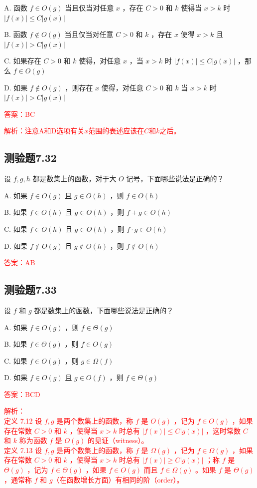 \documentclass[UTF8, heading=true]{ctexart}
\begin{document}
A. 
函数 $f \in O(g)$ 当且仅当对任意 $x$ ，存在 $C>0$ 和 $k$ 使得当 $x>k$ 时 $|f(x)| \leq C|g(x)|$

B. 
函数 $f \notin O(g)$ 当且仅当对任意 $C>0$ 和 $k$ ，存在 $x$ 使得 $x>k$ 且 $|f(x)|>C|g(x)|$

C. 
如果存在 $C>0$ 和 $k$ 使得，对任意 $x$ ，当 $x>k$ 时 $|f(x)| \leq C|g(x)|$ ，那么 $f \in O(g)$

D. 
如果 $f \notin O(g)$ ，则存在 $x$ 使得，对任意 $C>0$ 和 $k$ 当 $x>k$ 时 $|f(x)|>C|g(x)|$

\textcolor{red}{答案：BC}

\textcolor{red}{解析：注意A和D选项有关$x$范围的表述应该在$C$和$k$之后。}

\subsection{测验题7.32}

设 $f, g, h$ 都是数集上的函数，对于大 $O$ 记号，下面哪些说法是正确的？

A. 如果 $f \in O(g)$ 且 $g \in O(h)$ ，则 $f \in O(h)$

B. 如果 $f \in O(h)$ 且 $g \in O(h)$ ，则 $f+g \in O(h)$

C. 如果 $f \in O(h)$ 且 $g \in O(h)$ ，则 $f \cdot g \in O(h)$

D. 如果 $f \notin O(g)$ 且 $g \notin O(h)$ ，则 $f \notin O(h)$

\textcolor{red}{答案：AB}

\subsection{测验题7.33}

设 $f$ 和 $g$ 都是数集上的函数，下面哪些说法是正确的？

A. 如果 $f \in O(g)$ ，则 $f \in \Theta(g)$

B. 如果 $f \in \Theta(g)$ ，则 $f \in O(g)$

C. 如果 $f \in O(g)$ ，则 $g \in \Omega(f)$

D. 如果 $f \in O(g)$ 且 $g \in O(f)$ ，则 $f \in \Theta(g)$

\textcolor{red}{答案：BCD}

\textcolor{red}{解析：\\ \indent 定义 7.12 设 $f, g$ 是两个数集上的函数，称 $f$ 是 $O(g)$ ，记为 $f \in O(g)$ ，如果存在常数 $C>0$ 和 $k$ ，使得当 $x>k$ 时总有 $|f(x)| \leq C|g(x)|$ ，这时常数 $C$ 和 $k$ 称为函数 $f$ 是 $O(g)$ 的见证（witness）。
\\ \indent 定义 7.13 设 $f, g$ 是两个数集上的函数，称 $f$ 是 $\Omega(g)$ ，记为 $f \in \Omega(g)$ ，如果存在常数 $C>0$ 和 $k$ ，使得当 $x>k$ 时总有 $|f(x)| \geq C|g(x)|$ ；称 $f$ 是 $\Theta(g)$ ，记为 $f \in \Theta(g)$ ，如果 $f \in O(g)$ 而且 $f \in \Omega(g)$ 。如果 $f$ 是 $\Theta(g)$ ，通常称 $f$ 和 $g$（在函数增长方面）有相同的阶（order）。}
\end{document}
